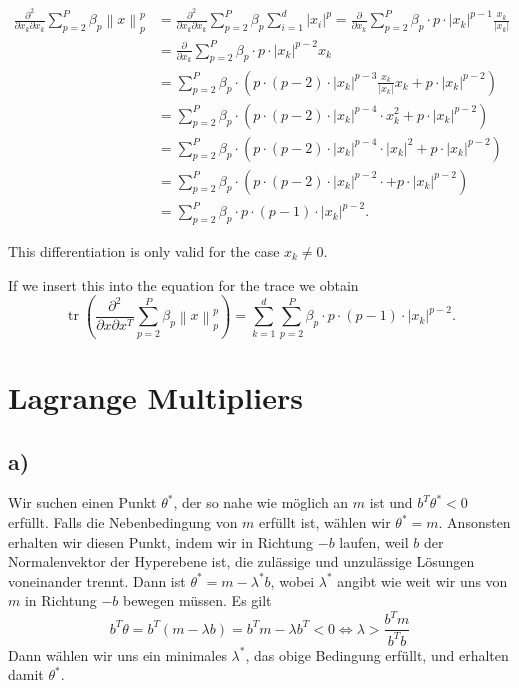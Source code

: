 \documentclass[paper=a4,fontsize=10pt,DIV11,BCOR10mm]{scrartcl}
\newcommand{\norm}[1]{\left\lVert#1\right\rVert}
\DeclareMathOperator{\tr}{tr}
\begin{document}
\begin{align*}
\frac{\partial^2}{\partial x_k\partial x_k} \sum_{p=2}^P \beta_p \norm{x}_p^p &=\frac{\partial^2}{\partial x_k\partial x_k}\sum_{p=2}^P \beta_p \sum_{i=1}^d \lvert x_i \rvert^p =\frac{\partial}{\partial x_k}\sum_{p=2}^P \beta_p \cdot p \cdot \lvert x_k\rvert^{p-1} \frac{x_k}{\lvert x_k\rvert}\\
&=\frac{\partial}{\partial x_k}\sum_{p=2}^P \beta_p \cdot  p \cdot \lvert x_k\rvert^{p-2} x_k \\
&=\sum_{p=2}^P \beta_p \cdot  ( p \cdot (p-2) \cdot \lvert x_k\rvert^{p-3}\frac{x_k}{\lvert x_k\rvert}  x_k +p \cdot \lvert x_k\rvert^{p-2})\\
&=\sum_{p=2}^P \beta_p \cdot ( p \cdot (p-2) \cdot \lvert x_k\rvert^{p-4}\cdot x_k^2 +p \cdot \lvert x_k\rvert^{p-2})\\
&= \sum_{p=2}^P \beta_p \cdot ( p \cdot (p-2) \cdot \lvert x_k\rvert^{p-4}\cdot \lvert x_k \rvert^2 +p \cdot \lvert x_k\rvert^{p-2})\\
&= \sum_{p=2}^P \beta_p \cdot ( p \cdot (p-2) \cdot \lvert x_k\rvert^{p-2}\cdot +p \cdot \lvert x_k\rvert^{p-2})\\
&= \sum_{p=2}^P \beta_p \cdot  p \cdot (p-1) \cdot \lvert x_k\rvert^{p-2}\text{.}
\end{align*}

This differentiation is only valid for the case $x_k \neq 0$.

If we insert this into the equation for the trace we obtain
\begin{equation*}
\tr(\frac{\partial^2}{\partial x\partial x^T} \sum_{p=2}^P \beta_p \norm{x}_p^p ) = \sum\limits_{k=1}^{d}\sum_{p=2}^P \beta_p \cdot  p \cdot (p-1) \cdot \lvert x_k\rvert^{p-2}\text{.}
\end{equation*}


\section{Lagrange Multipliers}

\subsection*{a)}

Wir suchen einen Punkt $\theta^*$, der so nahe wie möglich an $m$ ist und $b^T \theta^* < 0$ erfüllt. Falls die Nebenbedingung von $m$ erfüllt ist, wählen wir $\theta^* = m$. Ansonsten erhalten wir diesen Punkt, indem wir in Richtung $-b$ laufen, weil $b$ der Normalenvektor der Hyperebene ist, die zulässige und unzulässige Lösungen voneinander trennt. Dann ist $\theta^* = m - \lambda^* b$, wobei $\lambda^*$ angibt wie weit wir uns von $m$ in Richtung $-b$ bewegen müssen. Es gilt
\[ b^T \theta = b^T (m - \lambda b) = b^T m - \lambda b^T < 0 \Leftrightarrow \lambda > \frac{b^T m}{b^T b} \]
Dann wählen wir uns ein minimales $\lambda^*$, das obige Bedingung erfüllt, und erhalten damit $\theta^*$.
\end{document}
